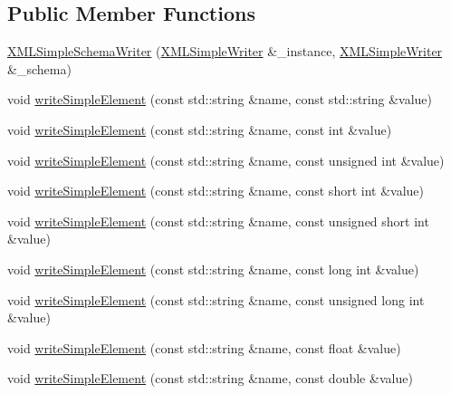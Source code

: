 \subsection*{Public Member Functions}
\begin{DoxyCompactItemize}
\item 
\mbox{\hyperlink{classXMLWriterAPI_1_1XMLSimpleSchemaWriter_a309425b6927188991ba8fb9d19e0caca}{X\+M\+L\+Simple\+Schema\+Writer}} (\mbox{\hyperlink{classXMLWriterAPI_1_1XMLSimpleWriter}{X\+M\+L\+Simple\+Writer}} \&\+\_\+instance, \mbox{\hyperlink{classXMLWriterAPI_1_1XMLSimpleWriter}{X\+M\+L\+Simple\+Writer}} \&\+\_\+schema)
\item 
void \mbox{\hyperlink{classXMLWriterAPI_1_1XMLSimpleSchemaWriter_a312669330ac26b8849f671ea23ea60de}{write\+Simple\+Element}} (const std\+::string \&name, const std\+::string \&value)
\item 
void \mbox{\hyperlink{classXMLWriterAPI_1_1XMLSimpleSchemaWriter_a40db83e5cfb496535b89dae68eeea314}{write\+Simple\+Element}} (const std\+::string \&name, const int \&value)
\item 
void \mbox{\hyperlink{classXMLWriterAPI_1_1XMLSimpleSchemaWriter_a378d9bf2c78118d6a8e1bc934f96ef1d}{write\+Simple\+Element}} (const std\+::string \&name, const unsigned int \&value)
\item 
void \mbox{\hyperlink{classXMLWriterAPI_1_1XMLSimpleSchemaWriter_a915b7adc844a85019793c873e2184298}{write\+Simple\+Element}} (const std\+::string \&name, const short int \&value)
\item 
void \mbox{\hyperlink{classXMLWriterAPI_1_1XMLSimpleSchemaWriter_a9fe3e03577fa580736944c58c2019d6b}{write\+Simple\+Element}} (const std\+::string \&name, const unsigned short int \&value)
\item 
void \mbox{\hyperlink{classXMLWriterAPI_1_1XMLSimpleSchemaWriter_a96700920c4929deb5e7093188b187402}{write\+Simple\+Element}} (const std\+::string \&name, const long int \&value)
\item 
void \mbox{\hyperlink{classXMLWriterAPI_1_1XMLSimpleSchemaWriter_a1c74f3c8d41ca4e660f119580de9202e}{write\+Simple\+Element}} (const std\+::string \&name, const unsigned long int \&value)
\item 
void \mbox{\hyperlink{classXMLWriterAPI_1_1XMLSimpleSchemaWriter_aea7726895cd925dac93eaad7c339a898}{write\+Simple\+Element}} (const std\+::string \&name, const float \&value)
\item 
void \mbox{\hyperlink{classXMLWriterAPI_1_1XMLSimpleSchemaWriter_adca0f83d1ac6848cdd95ad8b82ebcc1c}{write\+Simple\+Element}} (const std\+::string \&name, const double \&value)

\end{DoxyCompactItemize}
